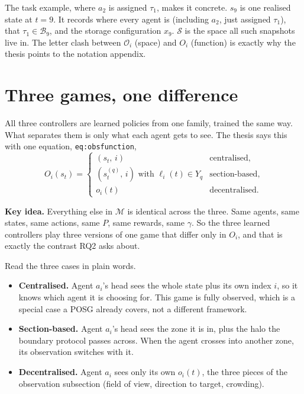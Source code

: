 \documentclass[11pt,a4paper]{article}
\newcommand{\idea}[1]{\par\smallskip\noindent\colorbox{boxbg}{\parbox{\dimexpr\linewidth-2\fboxsep}{\textbf{Key idea.} #1}}\par\smallskip}
\begin{document}
\noindent The task example, where $a_2$ is assigned $\tau_1$, makes it concrete. $s_9$ is one realised
state at $t=9$. It records where every agent is (including $a_2$, just
assigned $\tau_1$), that $\tau_1 \in \mathcal{B}_9$, and the storage
configuration $x_9$. $\mathcal{S}$ is the space all such snapshots live
in. The letter clash between $\mathcal{O}_i$ (space) and $O_i$
(function) is exactly why the thesis points to the notation appendix.

\section{Three games, one difference}
\label{sec:guide-games}

All three controllers are learned policies from one family, trained the
same way. What separates them is only what each agent gets to see. The
thesis says this with one equation, \texttt{eq:obsfunction},
\[
  O_i(s_t) =
  \begin{cases}
    (s_t,\, i) & \text{centralised},\\
    (s^{(q)}_t,\, i) \text{ with } \ell_i(t) \in Y_q & \text{section-based},\\
    o_i(t) & \text{decentralised}.
  \end{cases}
\]

\idea{Everything else in $\mathcal{M}$ is identical across the three.
Same agents, same states, same actions, same $P$, same rewards, same
$\gamma$. So the three learned controllers play three versions of one game
that differ only in $O_i$, and that is exactly the contrast RQ2 asks
about.}

\noindent Read the three cases in plain words.
\begin{itemize}[leftmargin=*]
  \item \textbf{Centralised.} Agent $a_i$'s head sees the whole state plus
        its own index $i$, so it knows which agent it is choosing for. This
        game is fully observed, which is a special case a POSG already
        covers, not a different framework.
  \item \textbf{Section-based.} Agent $a_i$'s head sees the zone it is in,
        plus the halo the boundary protocol passes across. When the agent
        crosses into another zone, its observation switches with it.
  \item \textbf{Decentralised.} Agent $a_i$ sees only its own $o_i(t)$,
        the three pieces of the observation subsection (field of view,
        direction to target, crowding).
\end{itemize}
\end{document}
